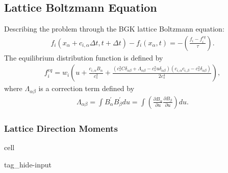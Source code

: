 \documentclass[letterpaper,10pt,english,openany,oneside]{jupyterBook}
\begin{document}
\subsection{Lattice Boltzmann Equation}
\label{\detokenize{LBM-Study/Convective-Diffusive-Equation:lattice-boltzmann-equation}}
\sphinxAtStartPar
Describing the problem through the BGK lattice Boltzmann equation:
\begin{equation}\label{equation:LBM-Study/Convective-Diffusive-Equation:LB-cvdif-Eq}
\begin{split}
f_{i}\left(x_{\alpha}+ c_{i,\alpha} \Delta t, t+\Delta t\right)- f_{i}(x_{\alpha}, t)= -\left( \frac{ f_{i} - f_{i}^{eq} }{ \tau } \right).
\end{split}
\end{equation}
\sphinxAtStartPar
The equilibrium distribution function is defined by
\begin{equation*}
\begin{split}
f^{eq}_{i} = w_{i}\left( u + \frac{c_{i,\alpha} B_{\alpha}}{c_{s}^{2}} + \frac{ \left( c_{s}^{2}C\delta_{\alpha\beta} + \Lambda_{\alpha\beta} - c_{s}^{2}u\delta_{\alpha\beta} \right) \left( c_{i,\alpha}c_{i,\beta} - c_{s}^{2}\delta_{\alpha\beta} \right)}{2c_{s}^{4}}  \right),
\end{split}
\end{equation*}
\sphinxAtStartPar
where \(\Lambda_{\alpha\beta}\) is a correction term defined by
\begin{equation*}
\begin{split}
\Lambda_{\alpha\beta} = \displaystyle\int  B_{\alpha}^{'}B_{\beta}^{'}  du = \displaystyle\int \left(\displaystyle\frac{\partial B_{\alpha}}{\partial u} \displaystyle\frac{\partial B_{\beta}}{\partial u} \right) du.
\end{split}
\end{equation*}

\subsubsection{Lattice Direction Moments}
\label{\detokenize{LBM-Study/Convective-Diffusive-Equation:lattice-direction-moments}}
\begin{sphinxuseclass}{cell}
\begin{sphinxuseclass}{tag_hide-input}
\end{sphinxuseclass}
\end{sphinxuseclass}
\end{document}
